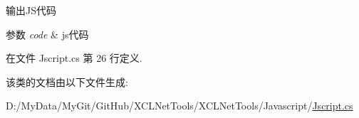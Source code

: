 输出\-J\-S代码 


\begin{DoxyParams}{参数}
{\em code} & js代码\\
\hline
\end{DoxyParams}


在文件 Jscript.\-cs 第 26 行定义.



该类的文档由以下文件生成\-:\begin{DoxyCompactItemize}
\item 
D\-:/\-My\-Data/\-My\-Git/\-Git\-Hub/\-X\-C\-L\-Net\-Tools/\-X\-C\-L\-Net\-Tools/\-Javascript/\hyperlink{_jscript_8cs}{Jscript.\-cs}\end{DoxyCompactItemize}
